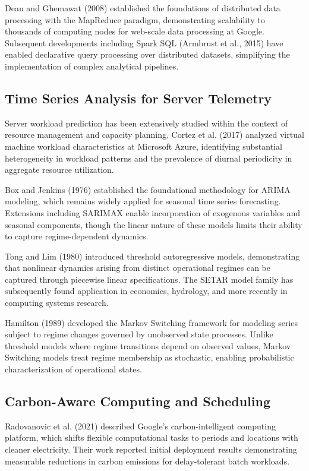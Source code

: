 \documentclass[12pt]{report}
\begin{document}
Dean and Ghemawat (2008) established the foundations of distributed data processing with the MapReduce paradigm, demonstrating scalability to thousands of computing nodes for web-scale data processing at Google. Subsequent developments including Spark SQL (Armbrust et al., 2015) have enabled declarative query processing over distributed datasets, simplifying the implementation of complex analytical pipelines.

\subsection{Time Series Analysis for Server Telemetry}

Server workload prediction has been extensively studied within the context of resource management and capacity planning. Cortez et al. (2017) analyzed virtual machine workload characteristics at Microsoft Azure, identifying substantial heterogeneity in workload patterns and the prevalence of diurnal periodicity in aggregate resource utilization.

Box and Jenkins (1976) established the foundational methodology for ARIMA modeling, which remains widely applied for seasonal time series forecasting. Extensions including SARIMAX enable incorporation of exogenous variables and seasonal components, though the linear nature of these models limits their ability to capture regime-dependent dynamics.

Tong and Lim (1980) introduced threshold autoregressive models, demonstrating that nonlinear dynamics arising from distinct operational regimes can be captured through piecewise linear specifications. The SETAR model family has subsequently found application in economics, hydrology, and more recently in computing systems research.

Hamilton (1989) developed the Markov Switching framework for modeling series subject to regime changes governed by unobserved state processes. Unlike threshold models where regime transitions depend on observed values, Markov Switching models treat regime membership as stochastic, enabling probabilistic characterization of operational states.

\subsection{Carbon-Aware Computing and Scheduling}

Radovanovic et al. (2021) described Google's carbon-intelligent computing platform, which shifts flexible computational tasks to periods and locations with cleaner electricity. Their work reported initial deployment results demonstrating measurable reductions in carbon emissions for delay-tolerant batch workloads.
\end{document}
